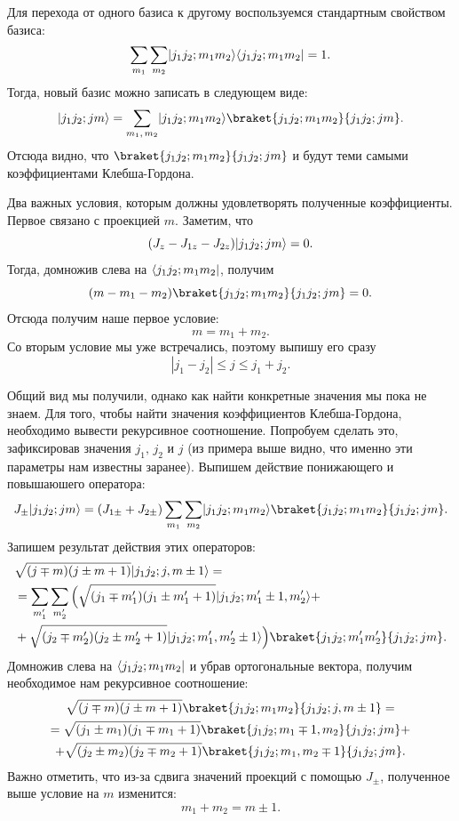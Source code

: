 Для перехода от одного базиса к другому воспользуемся стандартным свойством
базиса:
\[
  \sum_{m_1}\sum_{m_2}\lvert j_1j_2;m_1m_2\rangle\langle j_1j_2;m_1m_2\rvert=1.
\]
Тогда, новый базис можно записать в следующем виде:
\[
  \ket{j_1j_2;jm}=\sum_{m_1, \, m_2}\ket{j_1j_2;m_1m_2}\braket{j_1j_2;m_1m_2}{j_1j_2;jm}.
\]
Отсюда видно, что $\braket{j_1j_2;m_1m_2}{j_1j_2;jm}$ и будут теми самыми
коэффициентами Клебша-Гордона.

Два важных условия, которым должны удовлетворять полученные коэффициенты.
Первое связано с проекцией $m$. Заметим, что
\[
  (J_z - J_{1z} - J_{2z})\lvert j_1j_2; jm\rangle = 0.
\]
Тогда, домножив слева на $\langle j_1j_2; m_1 m_2\rvert$, получим
\[
  (m-m_1-m_2)\braket{j_1j_2; m_1 m_2}{j_1j_2; jm}=0.
\]
Отсюда получим наше первое условие:
\[
  m = m_1 + m_2.
\]
Со вторым условие мы уже встречались, поэтому выпишу его сразу
\[
  |j_1 - j_2| \leq j \leq j_1 + j_2.
\]

Общий вид мы получили, однако как найти конкретные значения мы пока не знаем.
Для того, чтобы найти значения коэффициентов Клебша-Гордона, необходимо вывести
рекурсивное соотношение. Попробуем сделать это, зафиксировав значения
$j_1,\,j_2$ и $j$ (из примера выше видно, что именно эти параметры нам известны
заранее). Выпишем действие понижающего и повышаюшего оператора:
\[
  J_{\pm}\ket{j_1 j_2; j m} = (J_{1\pm} +
  J_{2\pm})\sum_{m_1}\sum_{m_2}\ket{j_1 j_2;m_1 m_2}\braket{j_1 j_2;m_1 m_2}{j_1 j_2; j m}.
\]
Запишем результат действия этих операторов:
\begin{align*}
  &\sqrt{(j\mp m)(j\pm m + 1)}\ket{j_1 j_2; j, m\pm 1} =\\
  &= \sum_{m'_1}\sum_{m'_2}\Big( \sqrt{(j_1\mp m_1')(j_1\pm m_1' + 1)} \ket{j_1 j_2;m_1'\pm 1, m_2'} +\\
  &+ \sqrt{(j_2\mp m_2')(j_2\pm m_2' + 1)} \ket{j_1 j_2;m_1', m_2'\pm 1} \Big)
  \braket{j_1 j_2;m'_1 m'_2}{j_1 j_2; j m}.
\end{align*}
Домножив слева на $\langle j_1 j_2;m_1 m_2\rvert$ и убрав ортогональные вектора,
получим необходимое нам рекурсивное соотношение:
\begin{gather*}
  \sqrt{(j\mp m)(j\pm m + 1)}\braket{j_1 j_2;m_1 m_2}{j_1 j_2; j, m\pm 1} =\\
  = \sqrt{(j_1\pm m_1)(j_1\mp m_1 + 1)} \braket{j_1 j_2;m_1 \mp 1, m_2}{j_1 j_2;j m} + \\
  + \sqrt{(j_2\pm m_2)(j_2\mp m_2 + 1)} \braket{j_1 j_2;m_1, m_2 \mp 1}{j_1 j_2;j m}.
\end{gather*}
Важно отметить, что из-за сдвига значений проекций с помощью $J_{\pm}$,
полученное выше условие на $m$ изменится:
\[
  m_1 + m_2 = m\pm 1.
\]


